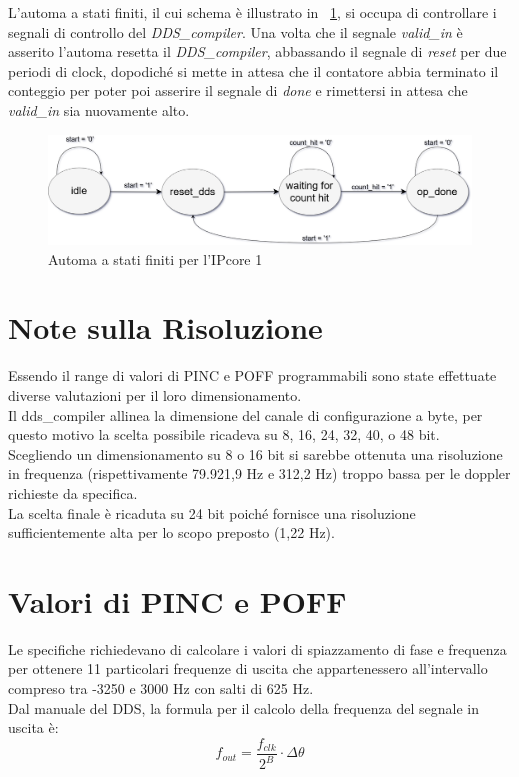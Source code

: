 \documentclass[12pt,a4paper,twoside,openany]{book}
\begin{document}
\clearpage
L'automa a stati finiti, il cui schema è illustrato in \figurename~\ref{ipcore1_fsm}, si occupa di controllare i segnali di controllo del \textit{DDS\_compiler}. Una volta che il segnale \textit{valid\_in} è asserito l'automa resetta il \textit{DDS\_compiler}, abbassando il segnale di \textit{reset} per due periodi di clock, dopodiché si mette in attesa che il contatore abbia terminato il conteggio per poter poi asserire il segnale di \textit{done} e rimettersi in attesa che \textit{valid\_in} sia nuovamente alto.

\begin{figure}
\begin{center}
\includegraphics[scale=0.35, keepaspectratio]{immagini/fsm_ipcore1}
\caption{Automa a stati finiti per l'IPcore 1}
\label{ipcore1_fsm}
\end{center}
\end{figure}

\section{Note sulla Risoluzione}
Essendo il range di valori di PINC e POFF programmabili sono state effettuate diverse valutazioni per il loro dimensionamento.\\
Il dds\_compiler allinea la dimensione del canale di configurazione a byte, per questo motivo la scelta possibile ricadeva su 8, 16, 24, 32, 40, o 48 bit.\\
Scegliendo un dimensionamento su 8 o 16 bit si sarebbe ottenuta una risoluzione in frequenza (rispettivamente 79.921,9 Hz e 312,2 Hz) troppo bassa per le doppler richieste da specifica.\\
La scelta finale è ricaduta su 24 bit poiché fornisce una risoluzione sufficientemente alta per lo scopo preposto (1,22 Hz).


\section{Valori di PINC e POFF}
Le specifiche richiedevano di calcolare i valori di spiazzamento di fase e frequenza per ottenere 11 particolari frequenze di uscita che appartenessero all'intervallo compreso tra -3250 e 3000 Hz con salti di 625 Hz. \\
Dal manuale del DDS, la formula per il calcolo della frequenza del segnale in uscita è:
$$
	f_{out} = {\frac{f_{clk}}{2^{B}}} \cdot {\Delta \theta}
$$
\end{document}
